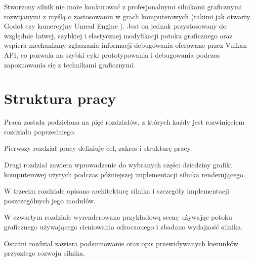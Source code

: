 Stworzony silnik nie może konkurować z profesjonalnymi silnikami graficznymi rozwijanymi z myślą o zastosowaniu w grach komputerowych (takimi jak otwarty Godot \cite{godotengine} czy komercyjny Unreal Engine \cite{unrealengine}).
Jest on jednak przystosowany do względnie łatwej, szybkiej i elastycznej modyfikacji potoku graficznego oraz wspiera mechanizmy zgłaszania informacji debugowania oferowane przez Vulkan API, co pozwala na szybki cykl prototypowania i debugowania podczas zapoznawania się z technikami graficznymi.

\section{Struktura pracy}


Praca została podzielona na pięć rozdziałów, z których każdy jest rozwinięciem rozdziału poprzedniego.

Pierwszy rozdział pracy definiuje cel, zakres i strukturę pracy.

Drugi rozdział zawiera wprowadzenie do wybranych części dziedziny grafiki komputerowej użytych podczas późniejszej implementacji silnika renderującego.

W trzecim rozdziale opisano architekturę silnika i szczegóły implementacji poszczególnych jego modułów.

W czwartym rozdziale wyrenderowano przykładową scenę używając potoku graficznego używającego cieniowania odroczonego  i zbadano wydajność silnika.

Ostatni rozdział zawiera podsumowanie oraz opis przewidywanych kierunków przyszłego rozwoju silnika.




